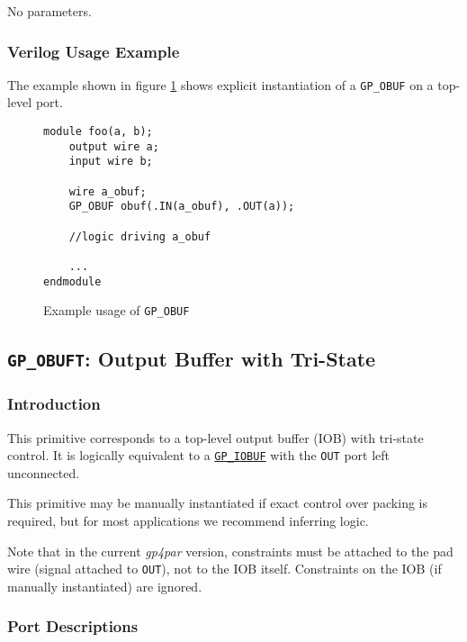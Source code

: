\documentclass[11pt]{article}
\newcommand{\namestyle}[1]{\textit{#1}}
\newcommand{\tokenstyle}[1]{\texttt{#1}}
\newcommand{\tokenref}[2]{\hyperref[#2]{\tokenstyle{#1}}}
\begin{document}
No parameters.

\subsubsection{Verilog Usage Example}

The example shown in figure \ref{gp-obuf-example} shows explicit instantiation of a \tokenstyle{GP\_OBUF} on a top-level port.

\begin{figure}[h]
\begin{lstlisting}
module foo(a, b);
	output wire a;
	input wire b;

	wire a_obuf;
	GP_OBUF obuf(.IN(a_obuf), .OUT(a));

	//logic driving a_obuf

	...
endmodule
\end{lstlisting}
\caption{Example usage of \tokenstyle{GP\_OBUF}}
\label{gp-obuf-example}
\end{figure}


\pagebreak
\subsection{\tokenstyle{GP\_OBUFT}: Output Buffer with Tri-State}
\label{gp-obuft}

\subsubsection{Introduction}
This primitive corresponds to a top-level output buffer (IOB) with tri-state control. It is logically equivalent to a
\tokenref{GP\_IOBUF}{gp-iobuf} with the \tokenstyle{OUT} port left unconnected.

This primitive may be manually instantiated if exact control over packing is required, but for most applications we
recommend inferring logic.

Note that in the current \namestyle{gp4par} version, constraints must be attached to the pad wire (signal attached to \tokenstyle{OUT}), not to the IOB itself. Constraints on the IOB (if manually instantiated) are ignored.

\subsubsection{Port Descriptions}
\end{document}
